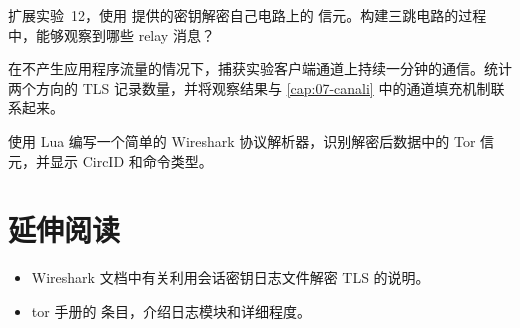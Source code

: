 \begin{esercizio}[2]\label{es:20-relay}
扩展实验~12，使用  提供的密钥解密自己电路上的  信元。构建三跳电路的过程中，能够观察到哪些 relay 消息？
\end{esercizio}

\begin{esercizio}[2]\label{es:20-padding}
在不产生应用程序流量的情况下，捕获实验客户端通道上持续一分钟的通信。统计两个方向的 TLS 记录数量，并将观察结果与 \cref{cap:07-canali} 中的通道填充机制联系起来。
\end{esercizio}

\begin{esercizio}[3]\label{es:20-dissector}
使用 Lua 编写一个简单的 Wireshark 协议解析器，识别解密后数据中的 Tor 信元，并显示 CircID 和命令类型。
\end{esercizio}

\section*{延伸阅读}
\begin{itemize}
  \item Wireshark 文档中有关利用会话密钥日志文件解密 TLS 的说明。
  \item tor 手册的  条目，介绍日志模块和详细程度。
\end{itemize}
